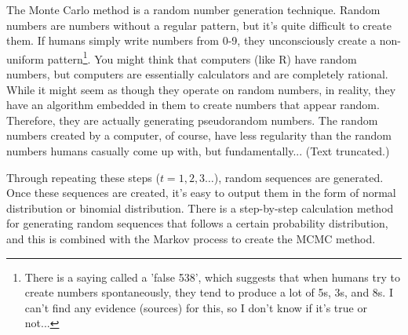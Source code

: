 \documentclass{ltjsarticle}
\begin{document}
The Monte Carlo method is a random number generation technique. Random numbers are numbers without a regular pattern, but it's quite difficult to create them. If humans simply write numbers from 0-9, they unconsciously create a non-uniform pattern\footnote{There is a saying called a 'false 538', which suggests that when humans try to create numbers spontaneously, they tend to produce a lot of 5s, 3s, and 8s. I can't find any evidence (sources) for this, so I don't know if it's true or not...}. You might think that computers (like R) have random numbers, but computers are essentially calculators and are completely rational. While it might seem as though they operate on random numbers, in reality, they have an algorithm embedded in them to create numbers that appear random. Therefore, they are actually generating pseudorandom numbers. The random numbers created by a computer, of course, have less regularity than the random numbers humans casually come up with, but fundamentally... (Text truncated.)

Through repeating these steps ($t=1,2,3\ldots$), random sequences are generated. Once these sequences are created, it's easy to output them in the form of normal distribution or binomial distribution. There is a step-by-step calculation method for generating random sequences that follows a certain probability distribution, and this is combined with the Markov process to create the MCMC method.
\end{document}
